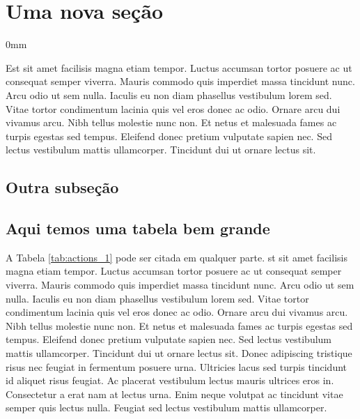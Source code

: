\documentclass[./main.tex]{subfiles}
\begin{document}
\section{Uma nova seção} \label{chp2:sec2}

\begin{adjustwidth}{\bodytab}{0mm}

\par Est sit amet facilisis magna etiam tempor. Luctus accumsan tortor posuere ac ut consequat semper viverra. Mauris commodo quis imperdiet massa tincidunt nunc. Arcu odio ut sem nulla. Iaculis eu non diam phasellus vestibulum lorem sed. Vitae tortor condimentum lacinia quis vel eros donec ac odio. Ornare arcu dui vivamus arcu. Nibh tellus molestie nunc non. Et netus et malesuada fames ac turpis egestas sed tempus. Eleifend donec pretium vulputate sapien nec. Sed lectus vestibulum mattis ullamcorper. Tincidunt dui ut ornare lectus sit.

\subsection{Outra subseção} \label{chp2:sec2:sub1}

\blindtext[3]

\subsection{Aqui temos uma tabela bem grande}  \label{chp2:sec2:sub2}

\par A Tabela \ref{tab:actions_1} pode ser citada em qualquer parte. st sit amet facilisis magna etiam tempor. Luctus accumsan tortor posuere ac ut consequat semper viverra. Mauris commodo quis imperdiet massa tincidunt nunc. Arcu odio ut sem nulla. Iaculis eu non diam phasellus vestibulum lorem sed. Vitae tortor condimentum lacinia quis vel eros donec ac odio. Ornare arcu dui vivamus arcu. Nibh tellus molestie nunc non. Et netus et malesuada fames ac turpis egestas sed tempus. Eleifend donec pretium vulputate sapien nec. Sed lectus vestibulum mattis ullamcorper. Tincidunt dui ut ornare lectus sit. Donec adipiscing tristique risus nec feugiat in fermentum posuere urna. Ultricies lacus sed turpis tincidunt id aliquet risus feugiat. Ac placerat vestibulum lectus mauris ultrices eros in. Consectetur a erat nam at lectus urna. Enim neque volutpat ac tincidunt vitae semper quis lectus nulla. Feugiat sed lectus vestibulum mattis ullamcorper.



\end{adjustwidth}
\end{document}
